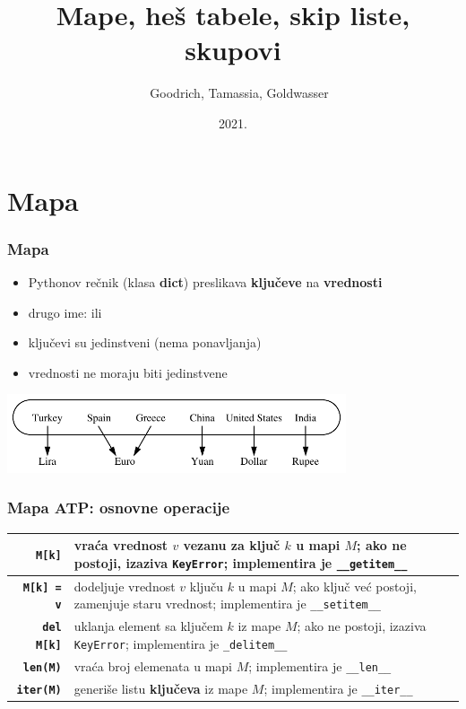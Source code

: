 \documentclass[compress,aspectratio=169]{beamer}
\title{Mape, heš tabele, skip liste, skupovi}
\author{\textcopyright \ \ Goodrich, Tamassia, Goldwasser}
\institute{Katedra za informatiku, Fakultet tehničkih nauka, Univerzitet u
Novom Sadu}
\date{2021.}
\begin{document}
\frame{\titlepage}

\section[Mapa]{Mapa}
\begin{frame}[fragile]
  \frametitle{Mapa}
  \begin{itemize}
    \item Pythonov rečnik (klasa \textbf{dict}) preslikava \textbf{ključeve} na \textbf{vrednosti} 
    \item drugo ime:  ili 
    \item ključevi su jedinstveni (nema ponavljanja)
    \item vrednosti ne moraju biti jedinstvene
  \end{itemize}
  \begin{center}
    \includegraphics[width=10cm]{asp-10-pic01.pdf}
  \end{center}
\end{frame}

\begin{frame}[fragile]
  \frametitle{Mapa ATP: osnovne operacije}
  \begin{center}
    \begin{tabular}{rp{12cm}}
      \textbf{\texttt{M[k]}} & vraća vrednost $v$ vezanu za ključ $k$ u mapi $M$; ako ne postoji, izaziva \texttt{KeyError}; implementira je \texttt{\_\_getitem\_\_} \\ \hline
      \textbf{\texttt{M[k] = v}} & dodeljuje vrednost $v$ ključu $k$ u mapi $M$; ako ključ već postoji, zamenjuje staru vrednost; implementira je \texttt{\_\_setitem\_\_} \\ \hline
      \textbf{\texttt{del M[k]}} & uklanja element sa ključem $k$ iz mape $M$; ako ne postoji, izaziva \texttt{KeyError}; implementira je \texttt{\_delitem\_\_} \\ \hline
      \textbf{\texttt{len(M)}} & vraća broj elemenata u mapi $M$; implementira je \texttt{\_\_len\_\_} \\ \hline
      \textbf{\texttt{iter(M)}} & generiše listu \textbf{ključeva} iz mape $M$;  implementira je \texttt{\_\_iter\_\_} \\
    \end{tabular}
  \end{center}
\end{frame}
\end{document}
